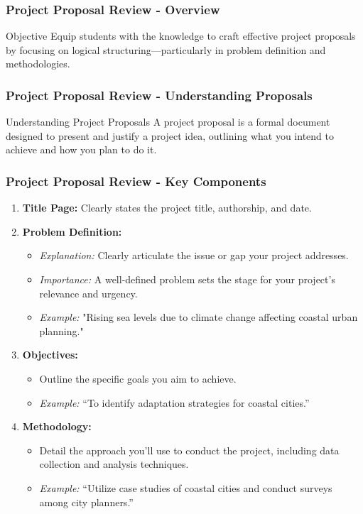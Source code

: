 \documentclass[aspectratio=169]{beamer}
\begin{document}
\begin{frame}[fragile]
    \frametitle{Project Proposal Review - Overview}
    \begin{block}{Objective}
        Equip students with the knowledge to craft effective project proposals by focusing on logical structuring—particularly in problem definition and methodologies.
    \end{block}
\end{frame}

\begin{frame}[fragile]
    \frametitle{Project Proposal Review - Understanding Proposals}
    \begin{block}{Understanding Project Proposals}
        A project proposal is a formal document designed to present and justify a project idea, outlining what you intend to achieve and how you plan to do it.
    \end{block}
\end{frame}

\begin{frame}[fragile]
    \frametitle{Project Proposal Review - Key Components}
    \begin{enumerate}
        \item \textbf{Title Page:} Clearly states the project title, authorship, and date.
        \item \textbf{Problem Definition:}
            \begin{itemize}
                \item \textit{Explanation:} Clearly articulate the issue or gap your project addresses.
                \item \textit{Importance:} A well-defined problem sets the stage for your project's relevance and urgency.
                \item \textit{Example:} "Rising sea levels due to climate change affecting coastal urban planning."
            \end{itemize}
        \item \textbf{Objectives:}
            \begin{itemize}
                \item Outline the specific goals you aim to achieve.
                \item \textit{Example:} “To identify adaptation strategies for coastal cities.”
            \end{itemize}
        \item \textbf{Methodology:}
            \begin{itemize}
                \item Detail the approach you'll use to conduct the project, including data collection and analysis techniques.
                \item \textit{Example:} “Utilize case studies of coastal cities and conduct surveys among city planners.”
            \end{itemize}
    \end{enumerate}
\end{frame}
\end{document}
